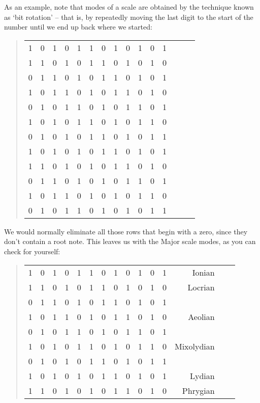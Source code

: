 \documentclass[english]{./gbook}
\begin{document}
\begin{large}
As an example, note that modes of a scale are obtained by the technique known as `bit rotation' -- that is, by repeatedly moving the last digit to the start of the number until we end up back where we started:
\begin{quote}
\begin{tabular}{rrrrrrrrrrrrrrr}
	1 & 0 &1 & 0 &1 & 1 & 0 & 1 & 0 & 1 & 0 & 1 \\
	1 & 1  & 0 &1 & 0 &1 & 1 & 0 & 1 & 0 & 1 & 0 \\
	0 & 1 & 1 & 0 &1 & 0 &1 & 1 & 0 & 1 & 0 & 1 \\
	1 & 0 & 1 & 1 & 0 &1 & 0 &1 & 1 & 0 & 1 & 0 \\
	0 & 1 & 0 & 1 & 1 & 0 &1 & 0 &1 & 1 & 0 & 1 \\
	1 & 0 & 1 & 0 & 1 & 1 & 0 &1 & 0 &1 & 1 & 0 \\
	0 & 1 & 0 & 1 & 0 & 1 & 1 & 0 &1 & 0 &1 & 1  \\
	1 & 0 & 1 & 0 & 1 & 0 & 1 & 1 & 0 &1 & 0 &1 \\
	1 & 1 & 0 & 1 & 0 & 1 & 0 & 1 & 1 & 0 &1 & 0 \\
	0 &1 & 1 & 0 & 1 & 0 & 1 & 0 & 1 & 1 & 0 &1 \\
	1 & 0 &1 & 1 & 0 & 1 & 0 & 1 & 0 & 1 & 1 & 0 \\
	0 &1 & 0 &1 & 1 & 0 & 1 & 0 & 1 & 0 & 1 & 1 \\
\end{tabular}
\end{quote}
We would normally eliminate all those rows that begin with a zero, since they don't contain a root note. This leaves us with the Major scale modes, as you can check for yourself:
\begin{quote}
\begin{tabular}{rrrrrrrrrrrrrrr}
	1 & 0 &1 & 0 &1 & 1 & 0 & 1 & 0 & 1 & 0 & 1 & Ionian\\
	1 & 1  & 0 &1 & 0 &1 & 1 & 0 & 1 & 0 & 1 & 0 & Locrian \\
	0 & 1 & 1 & 0 &1 & 0 &1 & 1 & 0 & 1 & 0 & 1 & \\
	1 & 0 & 1 & 1 & 0 &1 & 0 &1 & 1 & 0 & 1 & 0 & Aeolian\\
	0 & 1 & 0 & 1 & 1 & 0 &1 & 0 &1 & 1 & 0 & 1 &\\
	1 & 0 & 1 & 0 & 1 & 1 & 0 &1 & 0 &1 & 1 & 0 &  Mixolydian \\
	0 & 1 & 0 & 1 & 0 & 1 & 1 & 0 &1 & 0 &1 & 1  & \\
	1 & 0 & 1 & 0 & 1 & 0 & 1 & 1 & 0 &1 & 0 &1 &  Lydian \\
	1 & 1 & 0 & 1 & 0 & 1 & 0 & 1 & 1 & 0 &1 & 0 & Phrygian \\

\end{tabular}
\end{quote}
\end{large}
\end{document}
